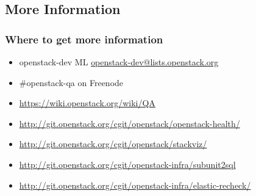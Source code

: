 \documentclass[aspectratio=169,11pt,hyperref={colorlinks=true}]{beamer}
\begin{document}
\subsection{More Information}
\begin{frame}
\frametitle{Where to get more information}
  \begin{itemize}
    \item openstack-dev ML\: \href{mailto:openstack-dev@lists.openstack.org}{openstack-dev@lists.openstack.org}
    \item \#openstack-qa on Freenode
    \item \url{https://wiki.openstack.org/wiki/QA}
    \item \url{http://git.openstack.org/cgit/openstack/openstack-health/}
    \item \url{http://git.openstack.org/cgit/openstack/stackviz/}
    \item \url{http://git.openstack.org/cgit/openstack-infra/subunit2sql}
    \item \url{http://git.openstack.org/cgit/openstack-infra/elastic-recheck/}
  \end{itemize}
\end{frame}

\end{document}

